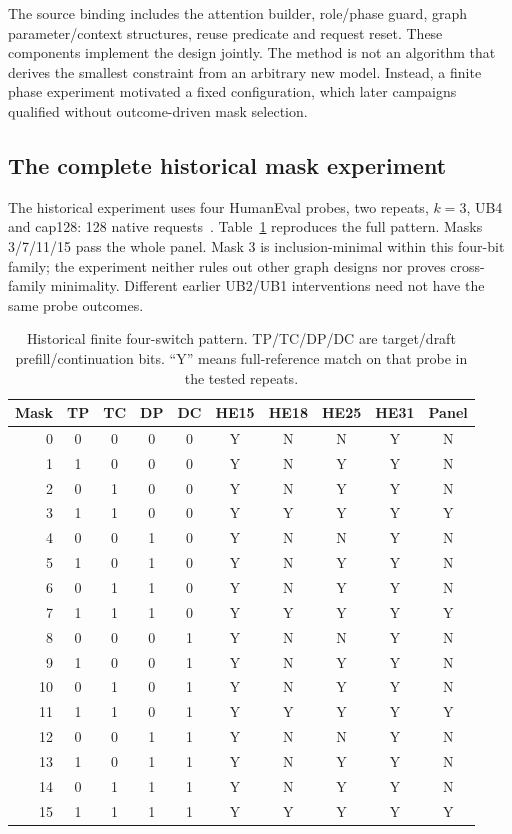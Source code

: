 The source binding includes the attention builder, role/phase guard, graph parameter/context structures, reuse predicate and request reset. These components implement the design jointly. The method is not an algorithm that derives the smallest constraint from an arbitrary new model. Instead, a finite phase experiment motivated a fixed configuration, which later campaigns qualified without outcome-driven mask selection.

\subsection{The complete historical mask experiment}
The historical experiment uses four HumanEval probes, two repeats, $k=3$, UB4 and cap128: 128 native requests~\cite{history}. Table~\ref{tab:masks} reproduces the full pattern. Masks 3/7/11/15 pass the whole panel. Mask 3 is inclusion-minimal within this four-bit family; the experiment neither rules out other graph designs nor proves cross-family minimality. Different earlier UB2/UB1 interventions need not have the same probe outcomes.

\begin{table}[t]\centering\small
\caption{Historical finite four-switch pattern. TP/TC/DP/DC are target/draft prefill/continuation bits. ``Y'' means full-reference match on that probe in the tested repeats.}
\label{tab:masks}
\begin{tabular}{@{}rccccccccc@{}}\toprule
Mask&TP&TC&DP&DC&HE15&HE18&HE25&HE31&Panel\\\midrule
0&0&0&0&0&Y&N&N&Y&N\\
1&1&0&0&0&Y&N&Y&Y&N\\
2&0&1&0&0&Y&N&Y&Y&N\\
3&1&1&0&0&Y&Y&Y&Y&Y\\
4&0&0&1&0&Y&N&N&Y&N\\
5&1&0&1&0&Y&N&Y&Y&N\\
6&0&1&1&0&Y&N&Y&Y&N\\
7&1&1&1&0&Y&Y&Y&Y&Y\\
8&0&0&0&1&Y&N&N&Y&N\\
9&1&0&0&1&Y&N&Y&Y&N\\
10&0&1&0&1&Y&N&Y&Y&N\\
11&1&1&0&1&Y&Y&Y&Y&Y\\
12&0&0&1&1&Y&N&N&Y&N\\
13&1&0&1&1&Y&N&Y&Y&N\\
14&0&1&1&1&Y&N&Y&Y&N\\
15&1&1&1&1&Y&Y&Y&Y&Y\\\bottomrule
\end{tabular}
\end{table}


